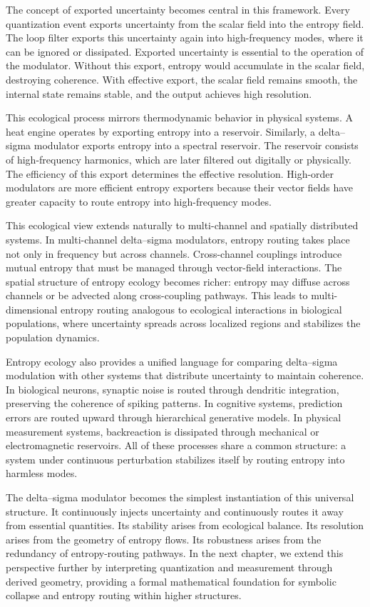 The concept of exported uncertainty becomes central in this framework. Every quantization event exports uncertainty from the scalar field into the entropy field. The loop filter exports this uncertainty again into high-frequency modes, where it can be ignored or dissipated. Exported uncertainty is essential to the operation of the modulator. Without this export, entropy would accumulate in the scalar field, destroying coherence. With effective export, the scalar field remains smooth, the internal state remains stable, and the output achieves high resolution.

This ecological process mirrors thermodynamic behavior in physical systems. A heat engine operates by exporting entropy into a reservoir. Similarly, a delta–sigma modulator exports entropy into a spectral reservoir. The reservoir consists of high-frequency harmonics, which are later filtered out digitally or physically. The efficiency of this export determines the effective resolution. High-order modulators are more efficient entropy exporters because their vector fields have greater capacity to route entropy into high-frequency modes.

This ecological view extends naturally to multi-channel and spatially distributed systems. In multi-channel delta–sigma modulators, entropy routing takes place not only in frequency but across channels. Cross-channel couplings introduce mutual entropy that must be managed through vector-field interactions. The spatial structure of entropy ecology becomes richer: entropy may diffuse across channels or be advected along cross-coupling pathways. This leads to multi-dimensional entropy routing analogous to ecological interactions in biological populations, where uncertainty spreads across localized regions and stabilizes the population dynamics.

Entropy ecology also provides a unified language for comparing delta–sigma modulation with other systems that distribute uncertainty to maintain coherence. In biological neurons, synaptic noise is routed through dendritic integration, preserving the coherence of spiking patterns. In cognitive systems, prediction errors are routed upward through hierarchical generative models. In physical measurement systems, backreaction is dissipated through mechanical or electromagnetic reservoirs. All of these processes share a common structure: a system under continuous perturbation stabilizes itself by routing entropy into harmless modes.

The delta–sigma modulator becomes the simplest instantiation of this universal structure. It continuously injects uncertainty and continuously routes it away from essential quantities. Its stability arises from ecological balance. Its resolution arises from the geometry of entropy flows. Its robustness arises from the redundancy of entropy-routing pathways. In the next chapter, we extend this perspective further by interpreting quantization and measurement through derived geometry, providing a formal mathematical foundation for symbolic collapse and entropy routing within higher structures.


